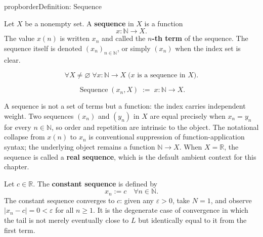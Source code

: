 \begin{bpnew}{propborder}{Definition: Sequence}
\begin{definition}[Sequence]
\label{def:sequence}

Let $X$ be a nonempty set. A \textbf{sequence} in $X$ is a function
\[
    x : \mathbb{N} \to X.
\]
The value $x(n)$ is written $x_n$ and called the \textbf{$n$-th term} of the
sequence. The sequence itself is denoted $(x_n)_{n \in \mathbb{N}}$, or
simply $(x_n)$ when the index set is clear.
\end{definition}
\end{bpnew}

\begin{remark*}
\[
\forall X \neq \varnothing \;\forall x : \mathbb{N} \to X
\;\bigl(x \text{ is a sequence in } X\bigr).
\]
\end{remark*}

\begin{remark*}
\[
\operatorname{Sequence}(x_n, X)
\;:=\;
x : \mathbb{N} \to X.
\]
\end{remark*}

\begin{remark*}[Interpretation]
A sequence is not a set of terms but a function: the index carries
independent weight. Two sequences $(x_n)$ and $(y_n)$ in $X$ are equal
precisely when $x_n = y_n$ for every $n \in \mathbb{N}$, so order and
repetition are intrinsic to the object. The notational collapse from
$x(n)$ to $x_n$ is conventional suppression of function-application
syntax; the underlying object remains a function $\mathbb{N} \to X$.
When $X = \mathbb{R}$, the sequence is called a \textbf{real sequence},
which is the default ambient context for this chapter.
\end{remark*}











\begin{example}
\label{ex:constant-sequence}

Let $c \in \mathbb{R}$. The \textbf{constant sequence} is defined by
\[
    x_n := c \quad \forall n \in \mathbb{N}.
\]
The constant sequence converges to $c$: given any $\varepsilon > 0$,
take $N = 1$, and observe $|x_n - c| = 0 < \varepsilon$ for all $n \ge 1$.
It is the degenerate case of convergence in which the tail is not merely
eventually close to $L$ but identically equal to it from the first term.
\end{example}


